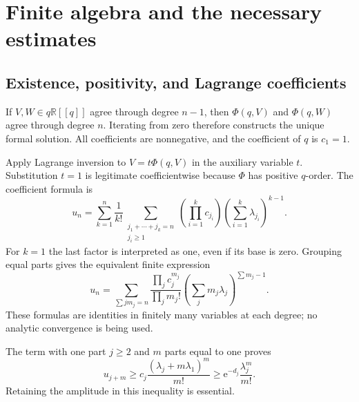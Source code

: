 \documentclass[11pt,a4paper]{article}
\numberwithin{equation}{section}
\theoremstyle{definition}
\theoremstyle{remark}
\theoremstyle{definition}
\newcommand{\R}{\mathbb R}
\newcommand{\e}{\mathrm e}
\begin{document}
\section{Finite algebra and the necessary estimates}
\label{sec:formal}

\subsection{Existence, positivity, and Lagrange coefficients}
If $V,W\in q\R[[q]]$ agree through degree $n-1$, then
$\Phi(q,V)$ and $\Phi(q,W)$ agree through degree $n$. Iterating from zero
therefore constructs the unique formal solution. All coefficients are
nonnegative, and the coefficient of $q$ is $c_1=1$.

Apply Lagrange inversion to $V=t\Phi(q,V)$ in the auxiliary variable
$t$. Substitution $t=1$ is legitimate coefficientwise because $\Phi$ has
positive $q$-order. The coefficient formula is
\begin{equation}
 u_n=\sum_{k=1}^{n}\frac1{k!}
     \sum_{\substack{j_1+\cdots+j_k=n\\j_i\ge1}}
        \left(\prod_{i=1}^k c_{j_i}\right)
        \left(\sum_{i=1}^k\lambda_{j_i}\right)^{k-1}.
 \label{eq:ordered-Lagrange}
\end{equation}
For $k=1$ the last factor is interpreted as one, even if its base is zero.
Grouping equal parts gives the equivalent finite expression
\begin{equation}
 u_n=\sum_{\sum j m_j=n}
      \frac{\prod_j c_j^{m_j}}{\prod_j m_j!}
            \left(\sum_jm_j\lambda_j\right)^{\sum m_j-1}.
 \label{eq:unordered-Lagrange}
\end{equation}
These formulas are identities in finitely many variables at each degree;
no analytic convergence is being used.

The term with one part $j\ge2$ and $m$ parts equal to one proves
\begin{equation}
 u_{j+m}\ge c_j\frac{(\lambda_j+m\lambda_1)^m}{m!}
              \ge \e^{-d_j}\frac{\lambda_j^m}{m!}.
 \label{eq:one-large}
\end{equation}
Retaining the amplitude in this inequality is essential.
\end{document}

